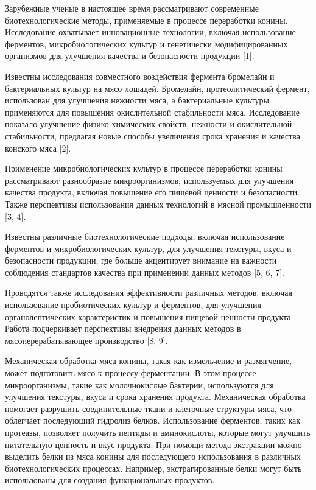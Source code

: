 Зарубежные ученые в настоящее время рассматривают современные
биотехнологические методы, применяемые в процессе переработки конины.
Исследование охватывает инновационные технологии, включая использование
ферментов, микробиологических культур и генетически модифицированных
организмов для улучшения качества и безопасности продукции {[}1{]}.

Известны исследования совместного воздействия фермента бромелайн и
бактериальных культур на мясо лошадей. Бромелайн, протеолитический
фермент, использован для улучшения нежности мяса, а бактериальные
культуры применяются для повышения окислительной стабильности мяса.
Исследование показало улучшение физико-химических свойств, нежности и
окислительной стабильности, предлагая новые способы увеличения срока
хранения и качества конского мяса {[}2{]}.

Применение микробиологических культур в процессе переработки конины
рассматривают разнообразие микроорганизмов, используемых для улучшения
качества продукта, включая повышение его пищевой ценности и
безопасности. Также перспективы использования данных технологий в мясной
промышленности {[}3, 4{]}.

Известны различные биотехнологические подходы, включая использование
ферментов и микробиологических культур, для улучшения текстуры, вкуса и
безопасности продукции, где больше акцентирует внимание на важности
соблюдения стандартов качества при применении данных методов {[}5, 6,
7{]}.

Проводятся также исследования эффективности различных методов, включая
использование пробиотических культур и ферментов, для улучшения
органолептических характеристик и повышения пищевой ценности продукта.
Работа подчеркивает перспективы внедрения данных методов в
мясоперерабатывающее производство {[}8, 9{]}.

Механическая обработка мяса конины, такая как измельчение и размягчение,
может подготовить мясо к процессу ферментации. В этом процессе
микроорганизмы, такие как молочнокислые бактерии, используются для
улучшения текстуры, вкуса и срока хранения продукта. Механическая
обработка помогает разрушить соединительные ткани и клеточные структуры
мяса, что облегчает последующий гидролиз белков. Использование
ферментов, таких как протеазы, позволяет получить пептиды и
аминокислоты, которые могут улучшить питательную ценность и вкус
продукта. При помощи метода экстракции можно выделить белки из мяса
конины для последующего использования в различных биотехнологических
процессах. Например, экстрагированные белки могут быть использованы для
создания функциональных продуктов.

